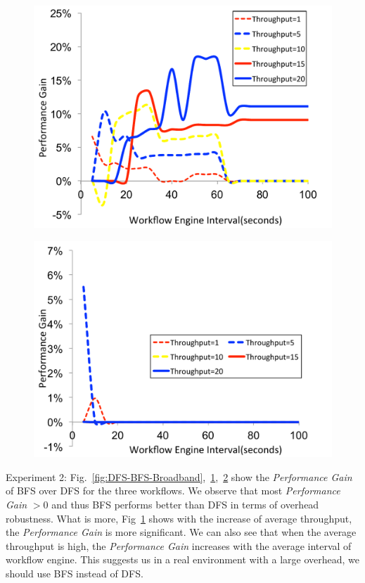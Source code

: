 \documentclass[final,5p,times,twocolumn]{elsarticle}
\begin{document}
\begin{figure}[!htb]
\centering
 \includegraphics[width=0.9\linewidth]{figure/DFS-BFS-CyberShake.pdf}
  \label{fig:DFS-BFS-CyberShake}
  \vspace{-10pt}
\end{figure}

\begin{figure}[!htb]
\centering
 \includegraphics[width=0.9\linewidth]{figure/DFS-BFS-Montage.pdf}
  \label{fig:DFS-BFS-Montage}
  \vspace{-10pt}
\end{figure}


Experiment 2: Fig.~\ref{fig:DFS-BFS-Broadband},~\ref{fig:DFS-BFS-CyberShake},~\ref{fig:DFS-BFS-Montage} show the \emph{Performance Gain} of BFS over DFS for the three workflows. We observe that most  \emph{Performance Gain} $>0$ and thus BFS performs better than DFS in terms of overhead robustness. What is more, Fig~\ref{fig:DFS-BFS-CyberShake} shows with the increase of average throughput, the \emph{Performance Gain} is more significant. We can also see that when the average throughput is high, the \emph{Performance Gain} increases with the average interval of workflow engine. This suggests us in a real environment with a large overhead, we should use BFS instead of DFS. 
\end{document}
